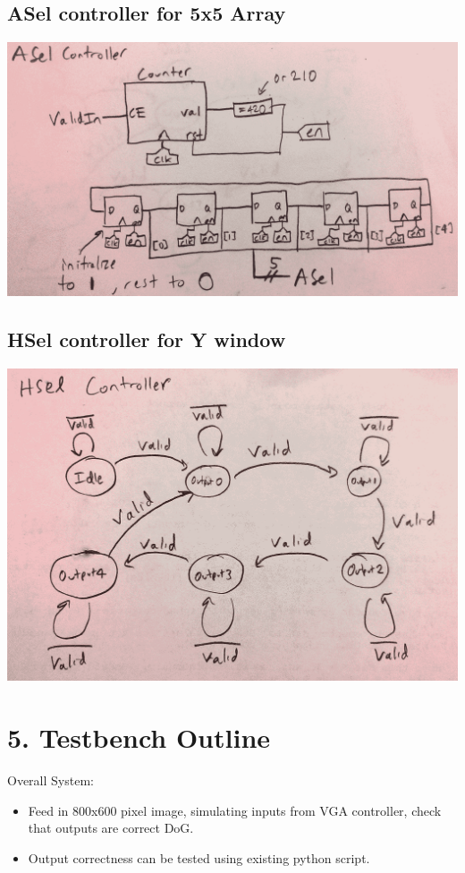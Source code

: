 \documentclass[11pt]{article}
\begin{document}
\subsection*{ASel controller for 5x5 Array}

\noindent\includegraphics[width=\textwidth]{controllers/procasel.png}

\subsection*{HSel controller for Y window}

\noindent\includegraphics[width=\textwidth]{controllers/prochsel.png}

\section*{5. Testbench Outline}
Overall System:
\begin{itemize}
    \item Feed in 800x600 pixel image, simulating inputs from VGA controller, check that outputs are correct DoG.
    \item Output correctness can be tested using existing python script.
\end{itemize}
\end{document}
